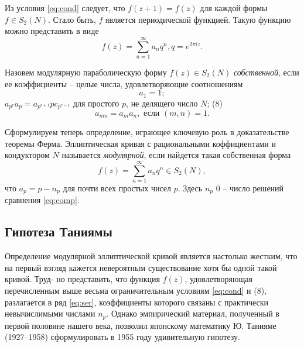 \begin{multicols}{3}
Из условия \eqref{eq:cond} следует, что $f(z + 1) = f(z)$ для каждой формы $f \in S_2(N)$. Стало быть, $f$ является периодической функцией. Такую функцию можно представить в виде
\begin{equation}
    \tag{7}
    \label{eq:ser}
    f(z) = \sum_{n=1}^{\infty} a_nq^n, q = e^{2\pi iz}.
\end{equation}

Назовем модулярную параболическую форму $f(z) \in S_2(N)$ \emph{собственной}, если ее коэффициенты -- целые числа, удовлетворяющие соотношениям
\begin{equation*}
    a_1 = 1;
\end{equation*}
$a_{p^r}a_p = a_{p^{r+1}}pc_{p^{r-1}}$ для простого $p$, не делящего число $N$; (8)
\begin{equation*}
    a_{mn} = a_ma_n, \text{ если } (m, n) = 1.
\end{equation*}

Сформулируем теперь определение, играющее ключевую роль в доказательстве теоремы Ферма. Эллиптическая кривая с рациональными коффициентами и кондуктором $N$ называется \emph{модулярной}, если найдется такая собственная форма
\begin{equation}
    \tag{9}
    f(z) = \sum_{n=1}^{\infty} a_nq^n \in S_2(N),
\end{equation}
что $a_p = p - n_p$ для почти всех простых чисел $p$. Здесь $n_p$ 0 -- число решений сравнения \eqref{eq:comp}.
\subsection*{Гипотеза Таниямы}
\noindent
Определение модулярной эллиптической кривой является настолько жестким, что на первый взгляд кажется невероятным существование хотя бы одной такой кривой. Труд- но представить, что функция $f(z)$, удовлетворяющая перечисленным выше весьма ограничительным условиям \eqref{eq:cond} и (8), разлагается в ряд \eqref{eq:ser}, коэффициенты которого связаны с практически невычислимыми числами $n_p$. Однако эмпирический материал, полученный в первой половине нашего века, позволил японскому математику Ю. Танияме (1927–1958) сформулировать в 1955 году удивительную гипотезу.
\end{multicols}
